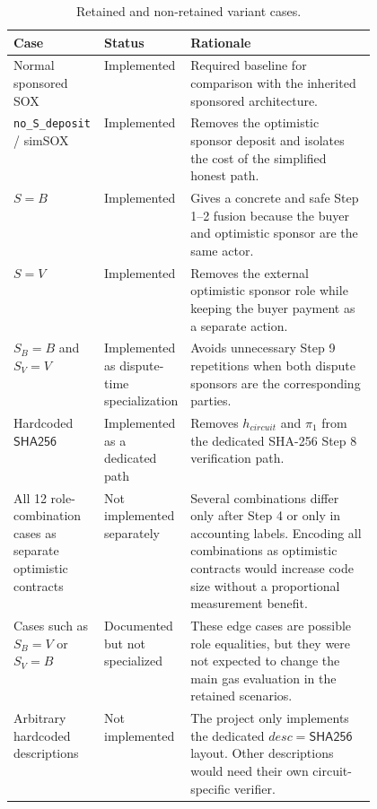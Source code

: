\begin{table}[htbp]
  \centering
  \begin{tabularx}{\linewidth}{>{\raggedright\arraybackslash}p{0.25\linewidth}>{\raggedright\arraybackslash}p{0.22\linewidth}>{\raggedright\arraybackslash}X}
    \toprule
    Case & Status & Rationale \\
    \midrule
    Normal sponsored SOX &
    Implemented &
    Required baseline for comparison with the inherited sponsored architecture. \\
    \texttt{no\_S\_deposit} / simSOX &
    Implemented &
    Removes the optimistic sponsor deposit and isolates the cost of the simplified honest
    path. \\
    \(S=B\) &
    Implemented &
    Gives a concrete and safe Step 1--2 fusion because the buyer and optimistic sponsor are
    the same actor. \\
    \(S=V\) &
    Implemented &
    Removes the external optimistic sponsor role while keeping the buyer payment as a
    separate action. \\
    \(S_B=B\) and \(S_V=V\) &
    Implemented as dispute-time specialization &
    Avoids unnecessary Step 9 repetitions when both dispute sponsors are the corresponding
    parties. \\
    Hardcoded \(\mathsf{SHA256}\) &
    Implemented as a dedicated path &
    Removes \(h_{\mathit{circuit}}\) and \(\pi_1\) from the dedicated SHA-256 Step 8
    verification path. \\
    All 12 role-combination cases as separate optimistic contracts &
    Not implemented separately &
    Several combinations differ only after Step 4 or only in accounting labels. Encoding all
    combinations as optimistic contracts would increase code size without a proportional
    measurement benefit. \\
    Cases such as \(S_B=V\) or \(S_V=B\) &
    Documented but not specialized &
    These edge cases are possible role equalities, but they were not expected to change the
    main gas evaluation in the retained scenarios. \\
    Arbitrary hardcoded descriptions &
    Not implemented &
    The project only implements the dedicated \(desc=\mathsf{SHA256}\) layout. Other
    descriptions would need their own circuit-specific verifier. \\
    \bottomrule
  \end{tabularx}
  \caption{Retained and non-retained variant cases.}
  \label{tab:variant-rationale}
\end{table}

